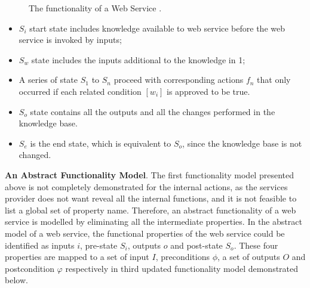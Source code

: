 \begin{figure}
\centerline{
}
\caption{ The functionality of a Web Service \cite{agarwal2010d5}.}
\label{fig:lts}
\end{figure}

\begin{itemize}
\item $S_i$ start state includes knowledge available to web service before the web service is invoked by inputs; 
\item $S_w$ state includes the inputs additional to the knowledge in 1; 
\item A series of state $S_1$ to $S_n$ proceed with corresponding actions $f_n$ that only occurred if each related condition $[w_i]$ is approved to be true. 
\item $S_o$ state contains all the outputs and all the changes performed in the knowledge base. 
\item $S_e$ is the end state, which is equivalent to $S_o$, since the knowledge base is not changed.
\end{itemize}

\textbf{An Abstract Functionality Model}. The first functionality model presented above is not completely demonstrated for the internal actions, as the services provider does not want reveal all the internal functions, and it is not feasible to list a global set of property name. Therefore, an abstract functionality of a web service is modelled by eliminating all the intermediate properties. In the abstract model of a web service, the functional properties of the web service could be identified as inputs $i$, pre-state $S_i$, outputs $o$ and post-state $S_o$. These four properties are mapped to a set of input $I$, preconditions $\phi$, a set of outputs $O$ and postcondition $\varphi$ respectively in third updated functionality model demonstrated below.

